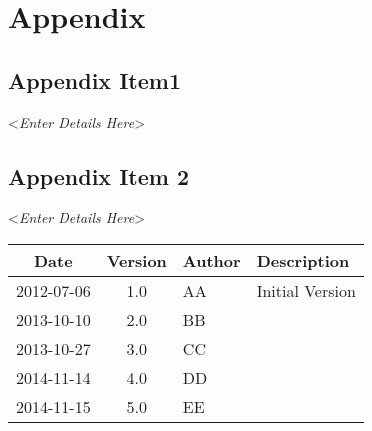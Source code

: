 \documentclass[english,12pt]{scrartcl}
\newcommand{\comment}[1]{\textless\textit{#1}\textgreater\vspace*{1ex}}
\begin{document}
\section{Appendix}
 
\subsection{Appendix Item1 }
 
\comment{Enter Details Here}
 
\subsection{Appendix Item 2}
 
\comment{Enter Details Here}
 
\begin{tabular}{cclp{}} \toprule
Date&Version & Author & Description \\ \midrule
 2012-07-06 & 1.0 & AA & Initial Version\\ 
 2013-10-10 & 2.0 & BB & \\ 
 2013-10-27 & 3.0 & CC & \\ 
 2014-11-14 & 4.0 & DD & \\ 
 2014-11-15 & 5.0 & EE & \\ \bottomrule
\end{tabular}		
\end{document}
